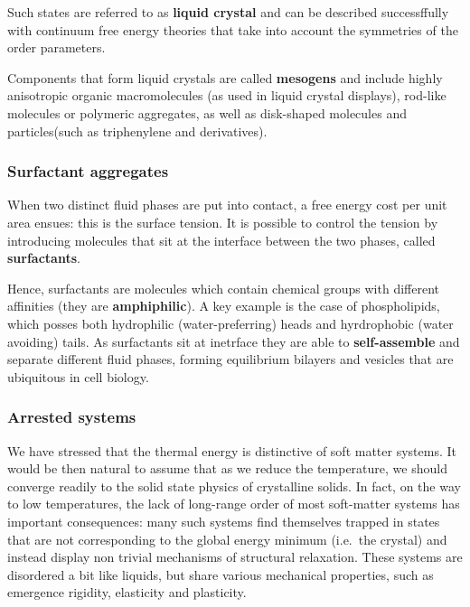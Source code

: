 \documentclass[
  letterpaper,
  enabledeprecatedfontcommands]{report}
\begin{document}
Such states are referred to as \textbf{liquid crystal} and can be
described successffully with continuum free energy theories that take
into account the symmetries of the order parameters.

Components that form liquid crystals are called \textbf{mesogens} and
include highly anisotropic organic macromolecules (as used in liquid
crystal displays), rod-like molecules or polymeric aggregates, as well
as disk-shaped molecules and particles(such as triphenylene and
derivatives).

\subsubsection*{Surfactant aggregates}\label{surfactant-aggregates}

When two distinct fluid phases are put into contact, a free energy cost
per unit area ensues: this is the surface tension. It is possible to
control the tension by introducing molecules that sit at the interface
between the two phases, called \textbf{surfactants}.

Hence, surfactants are molecules which contain chemical groups with
different affinities (they are \textbf{amphiphilic}). A key example is
the case of phospholipids, which posses both hydrophilic
(water-preferring) heads and hyrdrophobic (water avoiding) tails. As
surfactants sit at inetrface they are able to \textbf{self-assemble} and
separate different fluid phases, forming equilibrium bilayers and
vesicles that are ubiquitous in cell biology.

\subsubsection*{Arrested systems}\label{arrested-systems}

We have stressed that the thermal energy is distinctive of soft matter
systems. It would be then natural to assume that as we reduce the
temperature, we should converge readily to the solid state physics of
crystalline solids. In fact, on the way to low temperatures, the lack of
long-range order of most soft-matter systems has important consequences:
many such systems find themselves trapped in states that are not
corresponding to the global energy minimum (i.e.~the crystal) and
instead display non trivial mechanisms of structural relaxation. These
systems are disordered a bit like liquids, but share various mechanical
properties, such as emergence rigidity, elasticity and plasticity.
\end{document}
